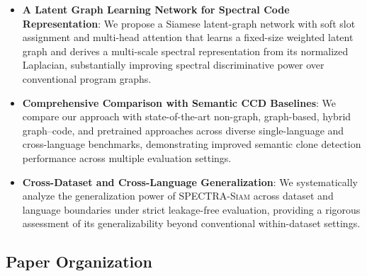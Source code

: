 \documentclass[final,5p,times,twocolumn]{elsarticle}
\newcommand{\method}{\textsc{SPECTRA-Siam}}
\theoremstyle{plain}
\begin{document}
\begin{itemize}
    \item \textbf{A Latent Graph Learning Network for Spectral Code Representation}: We propose a Siamese latent-graph network with soft slot assignment and multi-head attention that learns a fixed-size weighted latent graph and derives a multi-scale spectral representation from its normalized Laplacian, substantially improving spectral discriminative power over conventional program graphs.

    \item \textbf{Comprehensive Comparison with Semantic CCD Baselines}: We compare our approach with state-of-the-art non-graph, graph-based, hybrid graph--code, and pretrained approaches across diverse single-language and cross-language benchmarks, demonstrating improved semantic clone detection performance across multiple evaluation settings.

    \item \textbf{Cross-Dataset and Cross-Language Generalization}: We systematically analyze the generalization power of \method{} across dataset and language boundaries under strict leakage-free evaluation, providing a rigorous assessment of its generalizability beyond conventional within-dataset settings.
\end{itemize}





\subsection{Paper Organization}
\label{subsec:outline}
\end{document}
